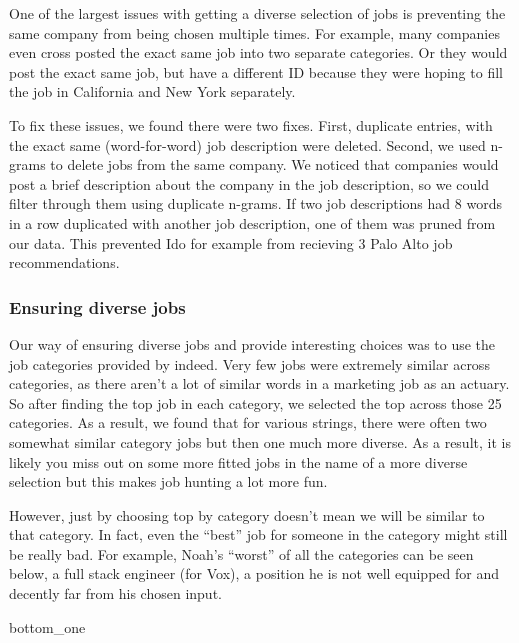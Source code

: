 \documentclass[
]{article}
\newenvironment{Shaded}{\begin{snugshade}}{\end{snugshade}}
\newcommand{\NormalTok}[1]{#1}
\begin{document}
One of the largest issues with getting a diverse selection of jobs is
preventing the same company from being chosen multiple times. For
example, many companies even cross posted the exact same job into two
separate categories. Or they would post the exact same job, but have a
different ID because they were hoping to fill the job in California and
New York separately.

To fix these issues, we found there were two fixes. First, duplicate
entries, with the exact same (word-for-word) job description were
deleted. Second, we used n-grams to delete jobs from the same company.
We noticed that companies would post a brief description about the
company in the job description, so we could filter through them using
duplicate n-grams. If two job descriptions had 8 words in a row
duplicated with another job description, one of them was pruned from our
data. This prevented Ido for example from recieving 3 Palo Alto job
recommendations.

\hypertarget{ensuring-diverse-jobs}{%
\subsubsection{Ensuring diverse jobs}\label{ensuring-diverse-jobs}}

Our way of ensuring diverse jobs and provide interesting choices was to
use the job categories provided by indeed. Very few jobs were extremely
similar across categories, as there aren't a lot of similar words in a
marketing job as an actuary. So after finding the top job in each
category, we selected the top across those 25 categories. As a result,
we found that for various strings, there were often two somewhat similar
category jobs but then one much more diverse. As a result, it is likely
you miss out on some more fitted jobs in the name of a more diverse
selection but this makes job hunting a lot more fun.

However, just by choosing top by category doesn't mean we will be
similar to that category. In fact, even the ``best'' job for someone in
the category might still be really bad. For example, Noah's ``worst'' of
all the categories can be seen below, a full stack engineer (for Vox), a
position he is not well equipped for and decently far from his chosen
input.

\begin{Shaded}
\begin{Highlighting}[]
\NormalTok{bottom\_one}
\end{Highlighting}
\end{Shaded}
\end{document}
